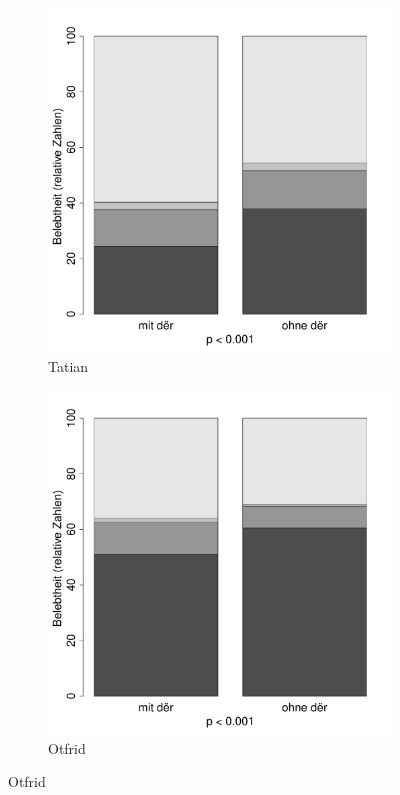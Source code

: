\begin{figure}[p]
\begin{subfigure}[b]{.5\linewidth}
  \includegraphics[height=.25\textheight]{generated/images/belebtheit-T}
\caption {Tatian}
\end{subfigure}%
\begin{subfigure}[b]{.5\linewidth}
  \includegraphics[height=.25\textheight]{generated/images/belebtheit-O}
\caption {Otfrid}
\end{subfigure}


\end{figure}
